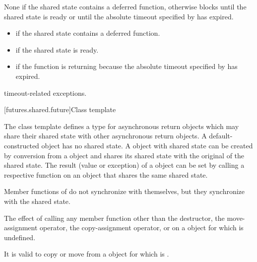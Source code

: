 \begin{itemdescr}
\pnum
{}%
\effects
None if the shared state contains a deferred function,
otherwise
blocks until the shared state is ready or until
the absolute timeout specified by  has expired.

\pnum
\returns

\begin{itemize}
\item {} if the shared state contains a deferred
function.

\item {} if the shared state is ready.

\item {} if the function is returning because the
absolute timeout
specified by  has expired.
\end{itemize}

\pnum
\throws
timeout-related exceptions.
\end{itemdescr}


[futures.shared.future]{Class template }

\pnum
The class template  defines a type for asynchronous return objects
which may share their shared state with other asynchronous return
objects. A default-constructed 
object has no shared state. A  object with
shared state can
be created
by conversion from a  object and shares its shared state with the
original  of the shared state.
The result (value or exception) of a  object
can be set by
calling a respective function on an
object that shares the same shared state.

\pnum
\begin{note}
Member functions of  do not synchronize with themselves,
but they synchronize with the shared state.
\end{note}

\pnum
The effect of calling any member function other than the destructor,
the move-assignment operator, the copy-assignment operator, or
 on a  object for which  is undefined.
\begin{note}
It is valid to copy or move from a 
object for which  is .
\end{note}


